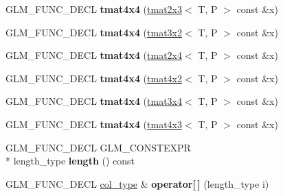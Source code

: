 \begin{DoxyCompactItemize}
\item 
\hypertarget{structglm_1_1tmat4x4_a966a90852a10e3214df58a8823260cb1}{G\-L\-M\-\_\-\-F\-U\-N\-C\-\_\-\-D\-E\-C\-L {\bfseries tmat4x4} (\hyperlink{structglm_1_1tmat2x3}{tmat2x3}$<$ T, P $>$ const \&x)}\label{structglm_1_1tmat4x4_a966a90852a10e3214df58a8823260cb1}

\item 
\hypertarget{structglm_1_1tmat4x4_aebc9c223de2814546e636fa023185bcb}{G\-L\-M\-\_\-\-F\-U\-N\-C\-\_\-\-D\-E\-C\-L {\bfseries tmat4x4} (\hyperlink{structglm_1_1tmat3x2}{tmat3x2}$<$ T, P $>$ const \&x)}\label{structglm_1_1tmat4x4_aebc9c223de2814546e636fa023185bcb}

\item 
\hypertarget{structglm_1_1tmat4x4_a2bbdcb0143f39ec4fe8319cc6ceaedd5}{G\-L\-M\-\_\-\-F\-U\-N\-C\-\_\-\-D\-E\-C\-L {\bfseries tmat4x4} (\hyperlink{structglm_1_1tmat2x4}{tmat2x4}$<$ T, P $>$ const \&x)}\label{structglm_1_1tmat4x4_a2bbdcb0143f39ec4fe8319cc6ceaedd5}

\item 
\hypertarget{structglm_1_1tmat4x4_a23f17aeae300219c962944a180316819}{G\-L\-M\-\_\-\-F\-U\-N\-C\-\_\-\-D\-E\-C\-L {\bfseries tmat4x4} (\hyperlink{structglm_1_1tmat4x2}{tmat4x2}$<$ T, P $>$ const \&x)}\label{structglm_1_1tmat4x4_a23f17aeae300219c962944a180316819}

\item 
\hypertarget{structglm_1_1tmat4x4_ad15d9ef57895ed333b7f6d857ac14306}{G\-L\-M\-\_\-\-F\-U\-N\-C\-\_\-\-D\-E\-C\-L {\bfseries tmat4x4} (\hyperlink{structglm_1_1tmat3x4}{tmat3x4}$<$ T, P $>$ const \&x)}\label{structglm_1_1tmat4x4_ad15d9ef57895ed333b7f6d857ac14306}

\item 
\hypertarget{structglm_1_1tmat4x4_a1826c29cae061983cde9d9dc860bc637}{G\-L\-M\-\_\-\-F\-U\-N\-C\-\_\-\-D\-E\-C\-L {\bfseries tmat4x4} (\hyperlink{structglm_1_1tmat4x3}{tmat4x3}$<$ T, P $>$ const \&x)}\label{structglm_1_1tmat4x4_a1826c29cae061983cde9d9dc860bc637}

\item 
\hypertarget{structglm_1_1tmat4x4_a2e53d701ad14884279d111739a038eb2}{G\-L\-M\-\_\-\-F\-U\-N\-C\-\_\-\-D\-E\-C\-L G\-L\-M\-\_\-\-C\-O\-N\-S\-T\-E\-X\-P\-R \\*
length\-\_\-type {\bfseries length} () const }\label{structglm_1_1tmat4x4_a2e53d701ad14884279d111739a038eb2}

\item 
\hypertarget{structglm_1_1tmat4x4_a4be08a6a3f8cb1f0954c2d0347961582}{G\-L\-M\-\_\-\-F\-U\-N\-C\-\_\-\-D\-E\-C\-L \hyperlink{structglm_1_1tvec4}{col\-\_\-type} \& {\bfseries operator\mbox{[}$\,$\mbox{]}} (length\-\_\-type i)}\label{structglm_1_1tmat4x4_a4be08a6a3f8cb1f0954c2d0347961582}


\end{DoxyCompactItemize}
